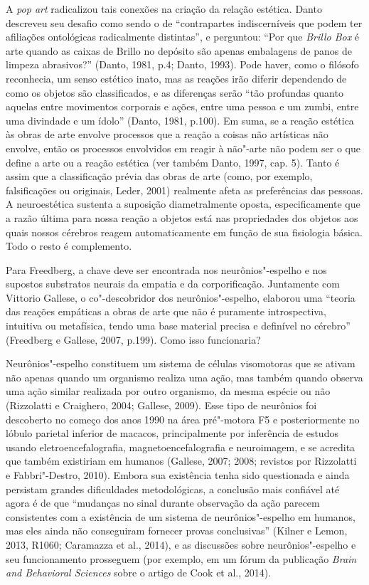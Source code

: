 A \emph{pop art} radicalizou tais conexões na criação da relação
estética. Danto descreveu seu desafio como sendo o de ``contrapartes
indiscerníveis que podem ter afiliações ontológicas radicalmente
distintas'', e perguntou: ``Por que \emph{Brillo Box} é arte quando as
caixas de Brillo no depósito são apenas embalagens de panos de limpeza
abrasivos?'' (Danto, 1981, p.4; Danto, 1993). Pode haver, como o
filósofo reconhecia, um senso estético inato, mas as reações irão
diferir dependendo de como os objetos são classificados, e as diferenças
serão ``tão profundas quanto aquelas entre movimentos corporais e ações,
entre uma pessoa e um zumbi, entre uma divindade e um ídolo'' (Danto,
1981, p.100). Em suma, se a reação estética às obras de arte envolve
processos que a reação a coisas não artísticas não envolve, então os
processos envolvidos em reagir à não"-arte não podem ser o que define a
arte ou a reação estética (ver também Danto, 1997, cap. 5). Tanto é
assim que a classificação prévia das obras de arte (como, por exemplo,
falsificações ou originais, Leder, 2001) realmente afeta as preferências
das pessoas. A neuroestética sustenta a suposição diametralmente oposta,
especificamente que a razão última para nossa reação a objetos está nas
propriedades dos objetos aos quais nossos cérebros reagem
automaticamente em função de sua fisiologia básica. Todo o resto é
complemento.

Para Freedberg, a chave deve ser encontrada nos neurônios"-espelho e nos
supostos substratos neurais da empatia e da corporificação. Juntamente
com Vittorio Gallese, o co"-descobridor dos neurônios"-espelho, elaborou
uma ``teoria das reações empáticas a obras de arte que não é puramente
introspectiva, intuitiva ou metafísica, tendo uma base material precisa
e definível no cérebro'' (Freedberg e Gallese, 2007, p.199). Como isso
funcionaria?

Neurônios"-espelho constituem um sistema de células visomotoras que se
ativam não apenas quando um organismo realiza uma ação, mas também
quando observa uma ação similar realizada por outro organismo, da mesma
espécie ou não (Rizzolatti e Craighero, 2004; Gallese, 2009). Esse tipo
de neurônios foi descoberto no começo dos anos 1990 na área pré"-motora
F5 e posteriormente no lóbulo parietal inferior de macacos,
principalmente por inferência de estudos usando eletroencefalografia,
magnetoencefalografia e neuroimagem, e se acredita que também existiriam
em humanos (Gallese, 2007; 2008; revistos por Rizzolatti e
Fabbri"-Destro, 2010). Embora sua existência tenha sido questionada e
ainda persistam grandes dificuldades metodológicas, a conclusão mais
confiável até agora é de que ``mudanças no sinal  durante observação
da ação parecem consistentes com a existência de um sistema de
neurônios"-espelho em humanos, mas eles ainda não conseguiram fornecer
provas conclusivas'' (Kilner e Lemon, 2013, R1060; Caramazza et al.,
2014), e as discussões sobre neurônios"-espelho e seu funcionamento
prosseguem (por exemplo, em um fórum da publicação \emph{Brain and
Behavioral Sciences} sobre o artigo de Cook et al., 2014).

